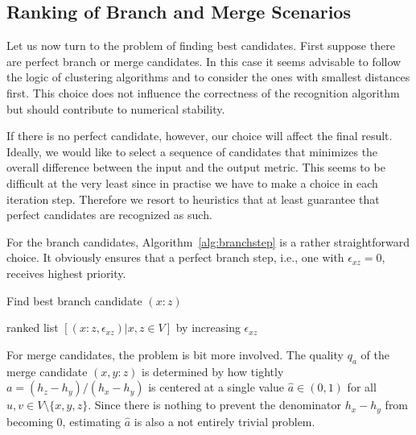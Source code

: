 \documentclass[amsmath]{lni}
\begin{document}
\subsection{Ranking of Branch and Merge Scenarios}

Let us now turn to the problem of finding best candidates. First suppose
there are perfect branch or merge candidates. In this case it seems
advisable to follow the logic of clustering algorithms and to consider the 
ones with smallest distances first. This choice does not influence the
correctness of the recognition algorithm but should contribute to numerical
stability.

If there is no perfect candidate, however, our choice will affect the final
result. Ideally, we would like to select a sequence of candidates that
minimizes the overall difference between the input and the output metric.
This seems to be difficult at the very least since in practise we have to
make a choice in each iteration step. Therefore we resort to heuristics
that at least guarantee that perfect candidates are recognized as such.

For the branch candidates, Algorithm~\ref{alg:branchstep} is a rather
straightforward choice. It obviously ensures that a perfect branch step,
i.e., one with $\epsilon_{xz}=0$, receives highest priority.

\begin{algorithm}[H]
\caption{Find best branch candidate $(x:z)$ } 
\label{alg:branchstep}
\SetAlgoLined
{}
\Return ranked list $[(x:z,\epsilon_{xz})| x,z\in V]$ by increasing 
$\epsilon_{xz}$\;
\end{algorithm} 

For merge candidates, the problem is bit more involved. The quality $q_a$
of the merge candidate $(x,y:z)$ is determined by how tightly
$a=(h_z-h_y)/(h_x-h_y)$ is centered at a single value $\hat a\in (0,1)$ for
all $u,v\in V\setminus\{x,y,z\}$. Since there is nothing to prevent the
denominator $h_x-h_y$ from becoming $0$, estimating $\hat a$ is also a not
entirely trivial problem.
\end{document}
